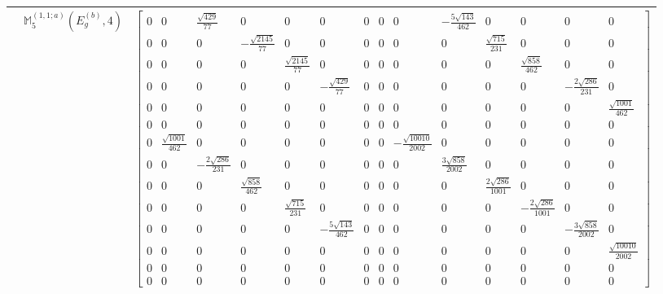 \documentclass[fleqn,8pt,landscape]{jsarticle}
\begin{document}
\begin{longtable}{ccc}
$  $ & $ \mathbb{M}_{5}^{(1,1;a)}(E_{g}^{(b)},4) $ & $ \begin{bmatrix} 0 & 0 & \frac{\sqrt{429}}{77} & 0 & 0 & 0 & 0 & 0 & 0 & - \frac{5 \sqrt{143}}{462} & 0 & 0 & 0 & 0 \\ 0 & 0 & 0 & - \frac{\sqrt{2145}}{77} & 0 & 0 & 0 & 0 & 0 & 0 & \frac{\sqrt{715}}{231} & 0 & 0 & 0 \\ 0 & 0 & 0 & 0 & \frac{\sqrt{2145}}{77} & 0 & 0 & 0 & 0 & 0 & 0 & \frac{\sqrt{858}}{462} & 0 & 0 \\ 0 & 0 & 0 & 0 & 0 & - \frac{\sqrt{429}}{77} & 0 & 0 & 0 & 0 & 0 & 0 & - \frac{2 \sqrt{286}}{231} & 0 \\ 0 & 0 & 0 & 0 & 0 & 0 & 0 & 0 & 0 & 0 & 0 & 0 & 0 & \frac{\sqrt{1001}}{462} \\ 0 & 0 & 0 & 0 & 0 & 0 & 0 & 0 & 0 & 0 & 0 & 0 & 0 & 0 \\ 0 & \frac{\sqrt{1001}}{462} & 0 & 0 & 0 & 0 & 0 & 0 & - \frac{\sqrt{10010}}{2002} & 0 & 0 & 0 & 0 & 0 \\ 0 & 0 & - \frac{2 \sqrt{286}}{231} & 0 & 0 & 0 & 0 & 0 & 0 & \frac{3 \sqrt{858}}{2002} & 0 & 0 & 0 & 0 \\ 0 & 0 & 0 & \frac{\sqrt{858}}{462} & 0 & 0 & 0 & 0 & 0 & 0 & \frac{2 \sqrt{286}}{1001} & 0 & 0 & 0 \\ 0 & 0 & 0 & 0 & \frac{\sqrt{715}}{231} & 0 & 0 & 0 & 0 & 0 & 0 & - \frac{2 \sqrt{286}}{1001} & 0 & 0 \\ 0 & 0 & 0 & 0 & 0 & - \frac{5 \sqrt{143}}{462} & 0 & 0 & 0 & 0 & 0 & 0 & - \frac{3 \sqrt{858}}{2002} & 0 \\ 0 & 0 & 0 & 0 & 0 & 0 & 0 & 0 & 0 & 0 & 0 & 0 & 0 & \frac{\sqrt{10010}}{2002} \\ 0 & 0 & 0 & 0 & 0 & 0 & 0 & 0 & 0 & 0 & 0 & 0 & 0 & 0 \\ 0 & 0 & 0 & 0 & 0 & 0 & 0 & 0 & 0 & 0 & 0 & 0 & 0 & 0 \end{bmatrix} $ \\ \hline
\end{longtable}
\end{document}
